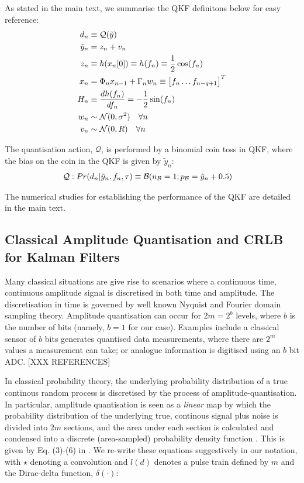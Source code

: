 As stated in the main text, we summarise the QKF definitons below for easy reference:
\begin{align}
d_n &\equiv \mathcal{Q}(\tilde{y})\\
\tilde{y}_n &= z_n + v_n \\
z_n & \equiv  h(x_n[0])  \equiv h(f_n) \equiv \frac{1}{2}\cos(f_{n}) \\
x_n & = \Phi_n x_{n-1} + \Gamma_n w_n  \equiv  \begin{bmatrix} f_{n} \hdots f_{n-q+1} \end{bmatrix}^T \\
H_n &\equiv \frac{d h(f_n)}{df_n} =  -\frac{1}{2}\sin(f_{n}) \\
w_n & \sim \mathcal{N}(0, \sigma^2) \quad \forall n \\
v_n & \sim \mathcal{N}(0, R) \quad \forall n
\end{align}

The quantisation action, $\mathcal{Q}$, is performed by a binomial coin toss in QKF, where the bias on the coin in the QKF is given by $\tilde{y}_n$:
\begin{align}
\mathcal{Q}: Pr(d_n| \tilde{y}_n, f_{n}, \tau) & \equiv \mathcal{B}(n_{\mathcal{B}}=1;p_{\mathcal{B}}= \tilde{y}_n + 0.5 ) \label{eqn:app:coinflipquantiser}
\end{align}

The numerical studies for establishing the performance of the QKF are detailed in the main text. 

\subsection{Classical Amplitude Quantisation and CRLB for Kalman Filters}

Many classical situations are give rise to scenarios where a continuous time, continuous amplitude signal is discretised in both time and amplitude. The discretisation in time is governed by well known Nyquist and Fourier domain sampling theory. Amplitude quantisation can occur for $2m = 2^b$ levels, where $b$ is the number of bits (namely, $b=1$ for our case). Examples include a classical sensor of $b$ bits generates quantised data measurements, where there are  $2^m$ values a measurement can take; or analogue information is digitised using an $b$ bit ADC. [XXX REFERENCES]

In classical probability theory, the underlying probability distribution of a true continous random process is discretised by the process of amplitude-quantisation. In particular, amplitude quantisation is seen as a \emph{linear} map by which the probability distribution of the underlying true, continous signal plus noise is divided into $2m$ sections, and the area under each section is calculated and condensed into a discrete (area-sampled) probability density function \cite{widrow1996,karlsson2005}.  This is given by Eq. (3)-(6) in \cite{karlsson2005}. We re-write these equations suggestively in our notation, with $\star$ denoting a convolution and $l(d)$ denotes a pulse train defined by $m$ and the Dirac-delta function, $\delta(\cdot)$:

